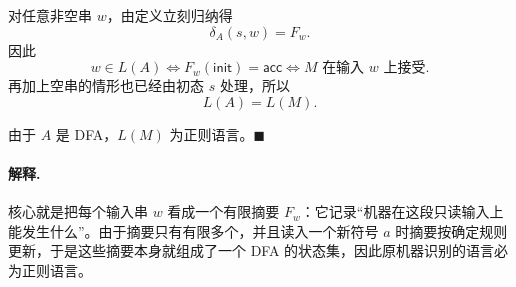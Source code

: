 \begin{answerred}
\medskip
对任意非空串 $w$，由定义立刻归纳得
\[
\delta_A(s,w)=F_w.
\]
因此
\[
w\in L(A)
\iff
F_w(\mathsf{init})=\mathsf{acc}
\iff
M\text{ 在输入 }w\text{ 上接受}.
\]
再加上空串的情形也已经由初态 $s$ 处理，所以
\[
L(A)=L(M).
\]

由于 $A$ 是 DFA，$L(M)$ 为正则语言。$\blacksquare$

\begin{answernote}
\paragraph{解释.}
核心就是把每个输入串 $w$ 看成一个有限摘要 $F_w$：它记录“机器在这段只读输入上能发生什么”。由于摘要只有有限多个，并且读入一个新符号 $a$ 时摘要按确定规则更新，于是这些摘要本身就组成了一个 DFA 的状态集，因此原机器识别的语言必为正则语言。
\end{answernote}
\end{answerred}

\clearpage
